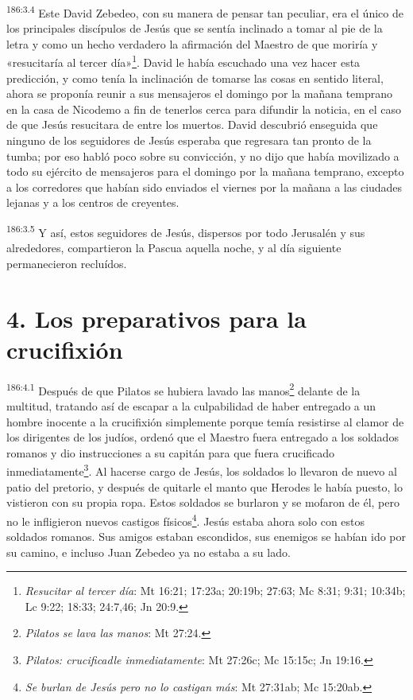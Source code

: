 \par
\textsuperscript{186:3.4} Este David Zebedeo, con su manera de pensar tan peculiar, era el único de los principales discípulos de Jesús que se sentía inclinado a tomar al pie de la letra y como un hecho verdadero la afirmación del Maestro de que moriría y «resucitaría al tercer día»\footnote{\textit{Resucitar al tercer día}: Mt 16:21; 17:23a; 20:19b; 27:63; Mc 8:31; 9:31; 10:34b; Lc 9:22; 18:33; 24:7,46; Jn 20:9.}. David le había escuchado una vez hacer esta predicción, y como tenía la inclinación de tomarse las cosas en sentido literal, ahora se proponía reunir a sus mensajeros el domingo por la mañana temprano en la casa de Nicodemo a fin de tenerlos cerca para difundir la noticia, en el caso de que Jesús resucitara de entre los muertos. David descubrió enseguida que ninguno de los seguidores de Jesús esperaba que regresara tan pronto de la tumba; por eso habló poco sobre su convicción, y no dijo que había movilizado a todo su ejército de mensajeros para el domingo por la mañana temprano, excepto a los corredores que habían sido enviados el viernes por la mañana a las ciudades lejanas y a los centros de creyentes.

\par
\textsuperscript{186:3.5} Y así, estos seguidores de Jesús, dispersos por todo Jerusalén y sus alrededores, compartieron la Pascua aquella noche, y al día siguiente permanecieron recluídos.

\section*{4. Los preparativos para la crucifixión}
\par
\textsuperscript{186:4.1} Después de que Pilatos se hubiera lavado las manos\footnote{\textit{Pilatos se lava las manos}: Mt 27:24.} delante de la multitud, tratando así de escapar a la culpabilidad de haber entregado a un hombre inocente a la crucifixión simplemente porque temía resistirse al clamor de los dirigentes de los judíos, ordenó que el Maestro fuera entregado a los soldados romanos y dio instrucciones a su capitán para que fuera crucificado inmediatamente\footnote{\textit{Pilatos: crucificadle inmediatamente}: Mt 27:26c; Mc 15:15c; Jn 19:16.}. Al hacerse cargo de Jesús, los soldados lo llevaron de nuevo al patio del pretorio, y después de quitarle el manto que Herodes le había puesto, lo vistieron con su propia ropa. Estos soldados se burlaron y se mofaron de él, pero no le infligieron nuevos castigos físicos\footnote{\textit{Se burlan de Jesús pero no lo castigan más}: Mt 27:31ab; Mc 15:20ab.}. Jesús estaba ahora solo con estos soldados romanos. Sus amigos estaban escondidos, sus enemigos se habían ido por su camino, e incluso Juan Zebedeo ya no estaba a su lado.

